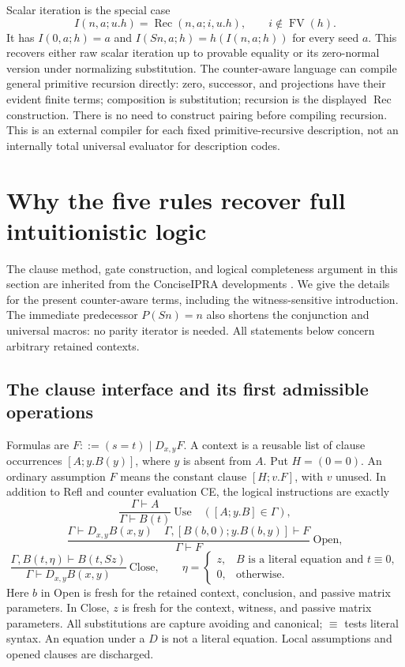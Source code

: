\documentclass[10pt,letterpaper]{article}
\theoremstyle{definition}
\theoremstyle{remark}
\begin{document}
Scalar iteration is the special case
\[
 I(n,a;u.h)=\operatorname{Rec}(n,a;i,u.h),
 \qquad i\notin\operatorname{FV}(h).
\]
It has $I(0,a;h)=a$ and $I(Sn,a;h)=h(I(n,a;h))$ for every seed $a$.
This recovers either raw scalar iteration up to provable equality or its
zero-normal version under normalizing substitution. The counter-aware
language can compile general primitive recursion directly: zero,
successor, and projections have their evident finite terms; composition is
substitution; recursion is the displayed $\operatorname{Rec}$ construction.
There is no need to construct pairing before compiling recursion.
This is an external compiler for each fixed primitive-recursive description,
not an internally total universal evaluator for description codes.



\section{Why the five rules recover full intuitionistic logic}
\label{sec:counter-logic}

The clause method, gate construction, and logical completeness argument in
this section are inherited from the ConciseIPRA developments \cite{basis,counter,single}. We give
the details for the present counter-aware terms, including the
witness-sensitive introduction. The immediate predecessor $P(Sn)=n$
also shortens the conjunction and universal macros: no parity iterator is
needed. All statements below concern arbitrary retained contexts.

\subsection{The clause interface and its first admissible operations}

Formulas are $F::=(s=t)\mid D_{x,y}F$. A context is a reusable list of
clause occurrences $[A;y.B(y)]$, where $y$ is absent from $A$. Put
$H=(0=0)$. An ordinary assumption $F$ means the constant clause
$[H;v.F]$, with $v$ unused. In addition to Refl and counter evaluation
CE, the logical instructions are exactly
\[
 \frac{\Gamma\vdash A}{\Gamma\vdash B(t)}\ \mathrm{Use}
 \quad([A;y.B]\in\Gamma),
\]
\[
 \frac{\Gamma\vdash D_{x,y}B(x,y)\quad
       \Gamma,[B(b,0);y.B(b,y)]\vdash F}
      {\Gamma\vdash F}\ \mathrm{Open},
\]
\[
 \frac{\Gamma,B(t,\eta)\vdash B(t,Sz)}
      {\Gamma\vdash D_{x,y}B(x,y)}\ \mathrm{Close},
 \qquad
 \eta=\begin{cases}
 z,& B\text{ is a literal equation and }t\equiv0,\\
 0,&\text{otherwise}.
 \end{cases}
\]
Here $b$ in Open is fresh for the retained context, conclusion, and passive
matrix parameters. In Close, $z$ is fresh for the context, witness, and
passive matrix parameters. All substitutions are capture avoiding and
canonical; $\equiv$ tests literal syntax. An equation under a $D$ is not
a literal equation. Local assumptions and opened clauses are discharged.
\end{document}
